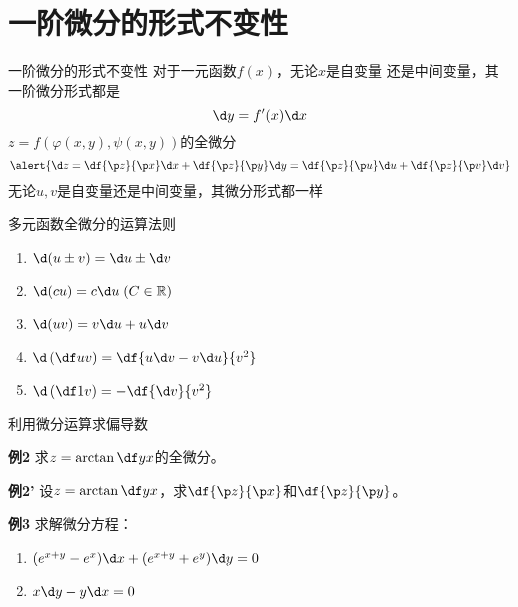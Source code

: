 \section{一阶微分的形式不变性}

\begin{frame}{一阶微分的形式不变性}
	\linespread{1.2}\pause 
	对于一元函数$f(x)$，无论$x$是自变量
	还是中间变量，其一阶微分形式都是
	$$\d y=f'(x)\d x$$
	\pause %
	$z=f(\varphi(x,y),\psi(x,y))$的全微分
	$$\alert{\d z=\df{\p z}{\p x}\d x+\df{\p z}{\p y}\d y
	=\df{\p z}{\p u}\d u+\df{\p z}{\p v}\d v}$$
	{\bb 无论$u,v$是自变量还是中间变量，其微分形式都一样}
\end{frame}

\begin{frame}[<+->]{多元函数全微分的运算法则}
	\linespread{1.5}
	\begin{enumerate}
	  \item $\d(u\pm v)=\d u\pm \d v$
	  \item $\d(cu)=c\d u\;(C\in\mathbb{R})$
	  \item $\d(uv)=v\d u+u\d v$
	  \item $\d\left(\df uv\right)=\df{u\d v-v\d u}{v^2}$
	  \item $\d\left(\df 1v\right)=-\df{\d v}{v^2}$
	\end{enumerate}
\end{frame}

\begin{frame}{利用微分运算求偏导数}
	\linespread{1.2}
	\begin{exampleblock}{{\bf 例2}\hfill}
		求$z=\arctan\df yx$的全微分。
	\end{exampleblock}\pause 
	\begin{exampleblock}{{\bf 例2'}\hfill}
		设$z=\arctan\df yx$，求$\df{\p z}{\p x}$和$\df{\p z}{\p y}$。
	\end{exampleblock}
\end{frame}

\begin{frame}
	\linespread{1.5}
	\begin{exampleblock}{{\bf 例3}\hfill}
		求解微分方程：\pause 
		\begin{enumerate}
		  \item $(e^{x+y}-e^x)\d x+(e^{x+y}+e^y)\d y=0$\pause 
		  \item $x\d y-y\d x=0$
		\end{enumerate}
	\end{exampleblock}
\end{frame}

